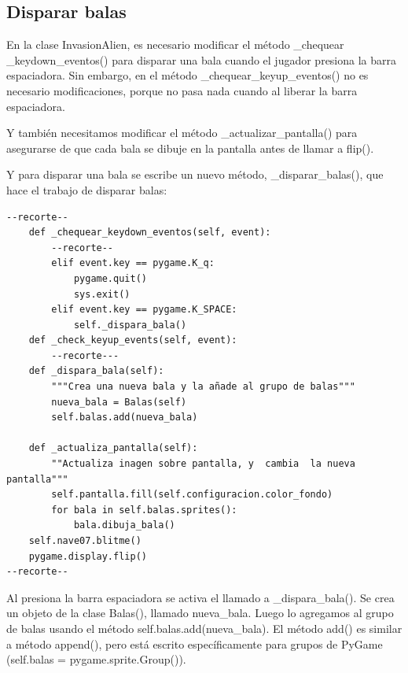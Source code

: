 \subsection{Disparar balas}	
	
En la clase  {\ttfamily InvasionAlien}, es necesario modificar el método {\ttfamily \_chequear\\ \_keydown\_eventos()} 
para disparar una bala cuando el jugador presiona la barra espaciadora. Sin embargo, en el método  {\ttfamily \_chequear\_keyup\_eventos()}  no es necesario modificaciones, porque no pasa nada cuando al liberar la barra espaciadora.

Y también  necesitamos   modificar el método  {\ttfamily \_actualizar\_pantalla()} para asegurarse de que cada bala se dibuje en la
pantalla antes de llamar a {\ttfamily flip()}.

Y para disparar una bala se escribe un nuevo método, {\ttfamily \_disparar\_balas()}, que hace el trabajo de disparar balas:


\hspace{-2.4cm}{\ttfamily \scriptsize invasión}

\vspace{-0.2cm}
\hspace{-2.1cm}{\ttfamily \scriptsize \_alien.py}\vspace{-0.84cm}
\begin{lstlisting}
--recorte--
    def _chequear_keydown_eventos(self, event):
        --recorte--
        elif event.key == pygame.K_q:
            pygame.quit()
            sys.exit()
        elif event.key == pygame.K_SPACE:
            self._dispara_bala()
    def _check_keyup_events(self, event):
        --recorte---
    def _dispara_bala(self):
        """Crea una nueva bala y la añade al grupo de balas"""
        nueva_bala = Balas(self)
        self.balas.add(nueva_bala)

    def _actualiza_pantalla(self):
        ""Actualiza inagen sobre pantalla, y  cambia  la nueva pantalla"""
        self.pantalla.fill(self.configuracion.color_fondo)
        for bala in self.balas.sprites():
            bala.dibuja_bala()
    self.nave07.blitme()
    pygame.display.flip()
--recorte--
\end{lstlisting}

Al presiona la barra espaciadora se activa el llamado a {\ttfamily\_dispara\_bala()}. Se crea un objeto  de  la clase {\ttfamily Balas()}, llamado  {\ttfamily nueva\_bala}. Luego lo agregamos al grupo de balas usando el método {\ttfamily  self.balas.add(nueva\_bala)}. El método {\ttfamily add()} es similar a método {\ttfamily append()}, pero está escrito específicamente para grupos de PyGame ({\ttfamily self.balas = pygame.sprite.Group()}).



